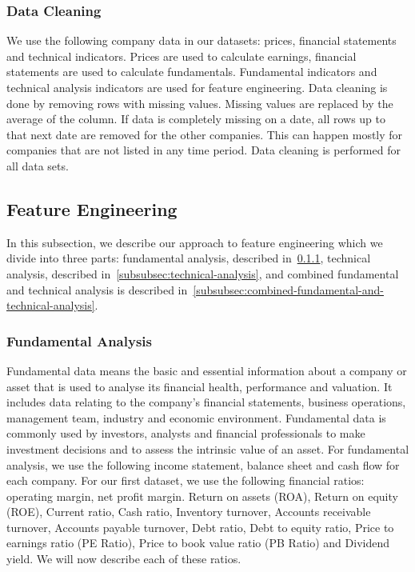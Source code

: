 \documentclass[../xlapes02]{subfiles}
\begin{document}
    \subsubsection{Data Cleaning}\label{subsubsec:data-cleaning}
    We use the following company data in our datasets: prices, financial statements and technical indicators. Prices are used to calculate earnings, financial statements are used to calculate fundamentals. Fundamental indicators and technical analysis indicators are used for feature engineering. Data cleaning is done by removing rows with missing values. Missing values are replaced by the average of the column. If data is completely missing on a date, all rows up to that next date are removed for the other companies. This can happen mostly for companies that are not listed in any time period. Data cleaning is performed for all data sets.

    \subsection{Feature Engineering}\label{subsubsec:feature-engineering}
    In this subsection, we describe our approach to feature engineering which we divide into three parts: fundamental analysis, described in~\cref{subsubsec:fundamental-analysis}, technical analysis, described in~\cref{subsubsec:technical-analysis}, and combined fundamental and technical analysis is described in~\cref{subsubsec:combined-fundamental-and-technical-analysis}.

    \subsubsection{Fundamental Analysis}\label{subsubsec:fundamental-analysis}
    Fundamental data means the basic and essential information about a company or asset that is used to analyse its financial health, performance and valuation. It includes data relating to the company's financial statements, business operations, management team, industry and economic environment. Fundamental data is commonly used by investors, analysts and financial professionals to make investment decisions and to assess the intrinsic value of an asset. For fundamental analysis, we use the following income statement, balance sheet and cash flow for each company. For our first dataset, we use the following financial ratios: operating margin, net profit margin. Return on assets (ROA), Return on equity (ROE), Current ratio, Cash ratio, Inventory turnover, Accounts receivable turnover, Accounts payable turnover, Debt ratio, Debt to equity ratio, Price to earnings ratio (PE Ratio), Price to book value ratio (PB Ratio) and Dividend yield. We will now describe each of these ratios.
\end{document}
